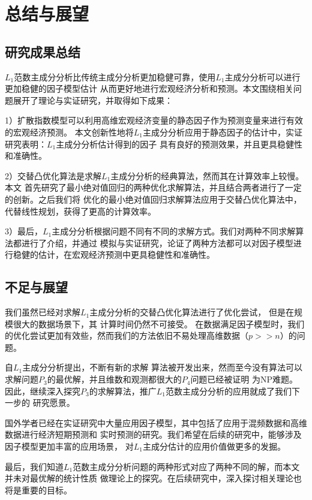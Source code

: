 \section{总结与展望}


\subsection{研究成果总结}
$L_1$范数主成分分析比传统主成分分析更加稳健可靠，使用$L_1$主成分分析可以进行更加稳健的因子模型估计
从而更好地进行宏观经济分析和预测。本文围绕相关问题展开了理论与实证研究，并取得如下成果：

1）扩散指数模型可以利用高维宏观经济变量的静态因子作为预测变量来进行有效的宏观经济预测。
本文创新性地将$L_1$主成分分析应用于静态因子的估计中，实证研究表明：$L_1$主成分分析估计得到的因子
具有良好的预测效果，并且更具稳健性和准确性。

2）交替凸优化算法是求解$L_1$主成分分析的经典算法，然而其在计算效率上较慢。本文
首先研究了最小绝对值回归的两种优化求解算法，并且结合两者进行了一定的创新。之后我们将
优化的最小绝对值回归求解算法应用于交替凸优化算法中，代替线性规划，获得了更高的计算效率。

3）最后，$L_1$主成分分析根据问题不同有不同的求解方式。我们对两种不同求解算法都进行了介绍，并通过
模拟与实证研究，论证了两种方法都可以对因子模型进行稳健的估计，在宏观经济预测中更具稳健性和准确性。

\subsection{不足与展望}
我们虽然已经对求解$L_1$主成分分析的交替凸优化算法进行了优化尝试，
但是在规模很大的数据场景下，其
计算时间仍然不可接受。
在数据满足因子模型时，我们的优化尝试更加有效些，然而我们的方法依旧不易处理高维数据（$p >> n$）的问题。

自$L_1$主成分分析提出，不断有新的求解
算法被开发出来，然而至今没有算法可以求解问题$P_3$的最优解，并且维数和观测都很大的$P_4$问题已经被证明
为NP难题。
因此，继续深入探究$P_3$的求解算法，推广$L_1$范数主成分分析的应用就成了我们下一步的
研究愿景。

国外学者已经在实证研究中大量应用因子模型，其中包括了应用于混频数据和高维数据进行经济短期预测和
实时预测的研究。我们希望在后续的研究中，能够涉及因子模型更加丰富的应用场景，
对$L_1$主成分估计的应用价值做更多的发掘。

最后，我们知道$L_1$范数主成分分析问题的两种形式对应了两种不同的解，而本文并未对最优解的统计性质
做理论上的探究。在后续研究中，深入探讨相关理论也将是重要的目标。

